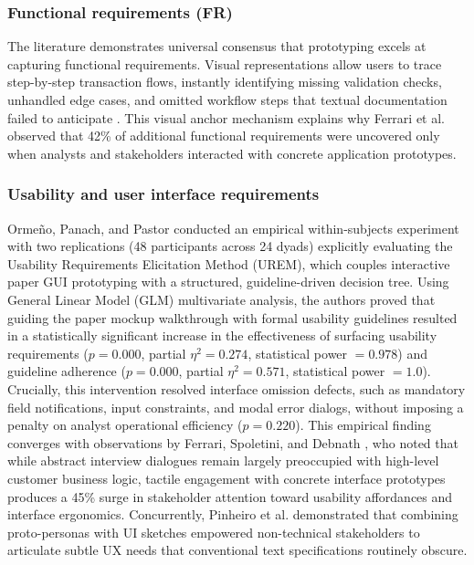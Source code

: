 \documentclass[conference]{IEEEtran}
\begin{document}
\subsubsection{Functional requirements (FR)}
The literature demonstrates universal consensus that prototyping excels at capturing functional requirements. Visual representations allow users to trace step-by-step transaction flows, instantly identifying missing validation checks, unhandled edge cases, and omitted workflow steps that textual documentation failed to anticipate \cite{rueda2020requirements}. This visual anchor mechanism explains why Ferrari et al. \cite{rej2022evolve} observed that 42\% of additional functional requirements were uncovered only when analysts and stakeholders interacted with concrete application prototypes.

\subsubsection{Usability and user interface requirements}
Orme{\~n}o, Panach, and Pastor \cite{uv2023empirical} conducted an empirical within-subjects experiment with two replications (48 participants across 24 dyads) explicitly evaluating the Usability Requirements Elicitation Method (UREM), which couples interactive paper GUI prototyping with a structured, guideline-driven decision tree. Using General Linear Model (GLM) multivariate analysis, the authors proved that guiding the paper mockup walkthrough with formal usability guidelines resulted in a statistically significant increase in the effectiveness of surfacing usability requirements ($p = 0.000$, partial $\eta^2 = 0.274$, statistical power $= 0.978$) and guideline adherence ($p = 0.000$, partial $\eta^2 = 0.571$, statistical power $= 1.0$). Crucially, this intervention resolved interface omission defects, such as mandatory field notifications, input constraints, and modal error dialogs, without imposing a penalty on analyst operational efficiency ($p = 0.220$). This empirical finding converges with observations by Ferrari, Spoletini, and Debnath \cite{rej2022evolve}, who noted that while abstract interview dialogues remain largely preoccupied with high-level customer business logic, tactile engagement with concrete interface prototypes produces a 45\% surge in stakeholder attention toward usability affordances and interface ergonomics. Concurrently, Pinheiro et al. \cite{jserd2019protopersona} demonstrated that combining proto-personas with UI sketches empowered non-technical stakeholders to articulate subtle UX needs that conventional text specifications routinely obscure.
\end{document}

